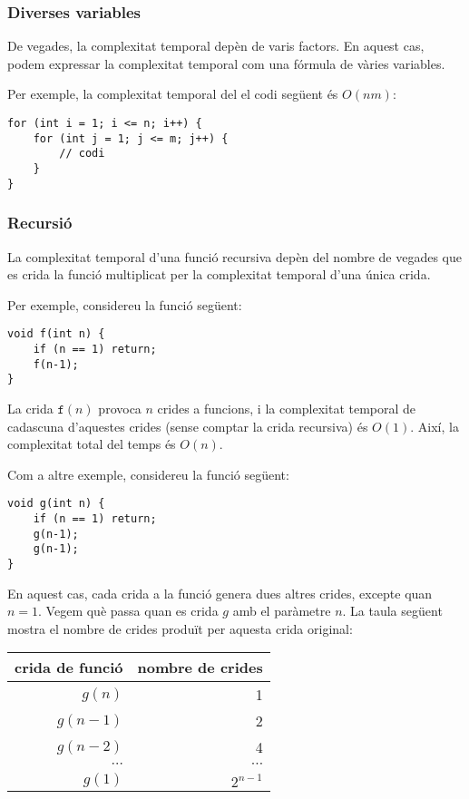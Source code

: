 \subsubsection*{Diverses variables}

De vegades, la complexitat temporal depèn de
varis factors.
En aquest cas, podem expressar la complexitat temporal
com una fórmula de vàries variables.

Per exemple, la complexitat temporal del
el codi següent és $O(nm)$:

\begin{lstlisting}
for (int i = 1; i <= n; i++) {
    for (int j = 1; j <= m; j++) {
        // codi
    }
}
\end{lstlisting}

\subsubsection*{Recursió}

La complexitat temporal d'una funció recursiva depèn
del nombre de vegades que es crida la funció
multiplicat per la complexitat temporal d'una única crida.

Per exemple, considereu la funció següent:
\begin{lstlisting}
void f(int n) {
    if (n == 1) return;
    f(n-1);
}
\end{lstlisting}
La crida $\texttt{f}(n)$ provoca $n$ crides a funcions,
i la complexitat temporal de cadascuna d'aquestes crides
(sense comptar la crida recursiva) és $O(1)$.
Així, la complexitat total del temps és $O(n)$.

Com a altre exemple, considereu la funció següent:
\begin{lstlisting}
void g(int n) {
    if (n == 1) return;
    g(n-1);
    g(n-1);
}
\end{lstlisting}
En aquest cas, cada crida a la funció genera dues altres
crides, excepte quan $n=1$.
Vegem què passa quan es crida $g$
amb el paràmetre $n$.
La taula següent mostra el nombre de crides
produït per aquesta crida original:

\begin{center}
\begin{tabular}{rr}
crida de funció & nombre de crides \\
\hline
$g(n)$ & 1 \\
$g(n-1)$ & 2 \\
$g(n-2)$ & 4 \\
$\cdots$ & $\cdots$ \\
$g(1)$ & $2^{n-1}$ \\
\end{tabular}
\end{center}

